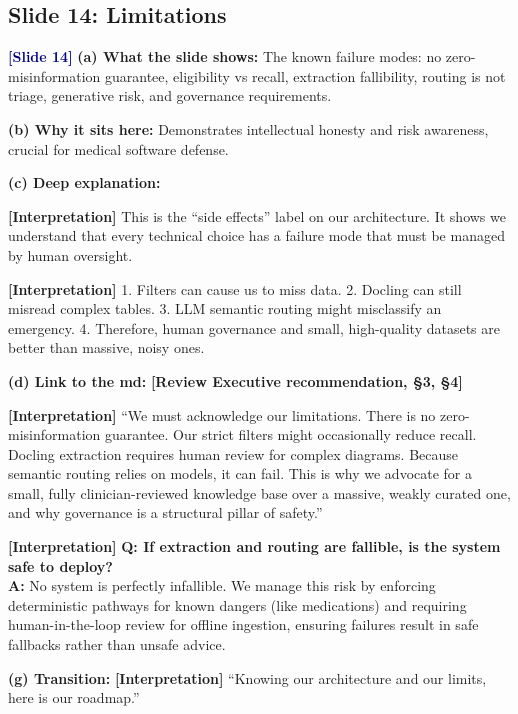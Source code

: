 \documentclass[11pt,a4paper]{article}
\newcommand{\origintag}[2]{\textcolor{#1}{\small\textbf{[#2]}}}
\begin{document}
\subsection{Slide 14: Limitations}
\origintag{navy}{Slide 14}
\textbf{(a) What the slide shows:} The known failure modes: no zero-misinformation guarantee, eligibility vs recall, extraction fallibility, routing is not triage, generative risk, and governance requirements.

\textbf{(b) Why it sits here:} Demonstrates intellectual honesty and risk awareness, crucial for medical software defense.

\textbf{(c) Deep explanation:}
\begin{analogy}
\origintag{slate}{Interpretation} This is the ``side effects'' label on our architecture. It shows we understand that every technical choice has a failure mode that must be managed by human oversight.
\end{analogy}
\origintag{slate}{Interpretation} 1. Filters can cause us to miss data. 2. Docling can still misread complex tables. 3. LLM semantic routing might misclassify an emergency. 4. Therefore, human governance and small, high-quality datasets are better than massive, noisy ones.

\textbf{(d) Link to the md:} \origintag{amber}{Review Executive recommendation, \S3, \S4}

\begin{sayit}
\origintag{slate}{Interpretation} ``We must acknowledge our limitations. There is no zero-misinformation guarantee. Our strict filters might occasionally reduce recall. Docling extraction requires human review for complex diagrams. Because semantic routing relies on models, it can fail. This is why we advocate for a small, fully clinician-reviewed knowledge base over a massive, weakly curated one, and why governance is a structural pillar of safety.''
\end{sayit}

\begin{qa}
\origintag{slate}{Interpretation} \textbf{Q: If extraction and routing are fallible, is the system safe to deploy?} \\
\textbf{A:} No system is perfectly infallible. We manage this risk by enforcing deterministic pathways for known dangers (like medications) and requiring human-in-the-loop review for offline ingestion, ensuring failures result in safe fallbacks rather than unsafe advice.
\end{qa}
\textbf{(g) Transition:} \origintag{slate}{Interpretation} ``Knowing our architecture and our limits, here is our roadmap.''
\end{document}
